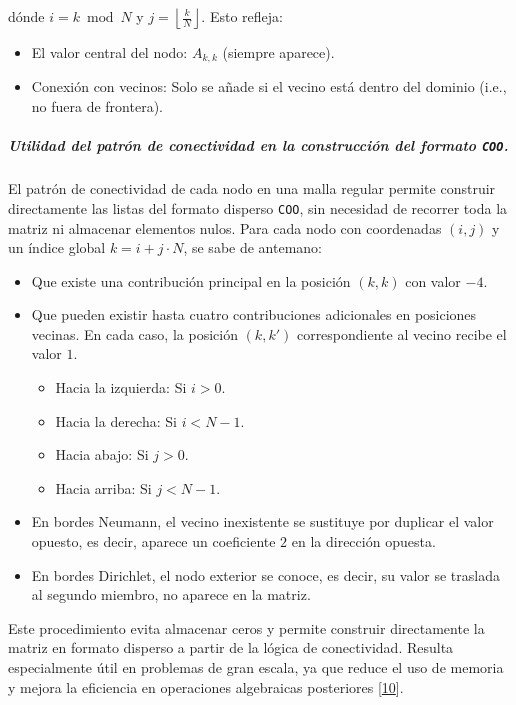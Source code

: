 \documentclass{article}
\begin{document}
\noindent dónde $i = k \bmod N$ y $j = \left\lfloor \frac{k}{N} \right\rfloor$. Esto refleja:
\begin{itemize}
    \item El valor central del nodo: $A_{k,k}$ (siempre aparece).
    \item Conexión con vecinos: Solo se añade si el vecino está dentro del dominio (i.e., no fuera de frontera).
\end{itemize}

\subparagraph{Utilidad del patrón de conectividad en la construcción del formato \texttt{COO}.} El patrón de conectividad de cada nodo en una malla regular permite construir directamente las listas del formato disperso \texttt{COO}, sin necesidad de recorrer toda la matriz ni almacenar elementos nulos. Para cada nodo con coordenadas $(i, j)$ y un índice global $k = i + j \cdot N$, se sabe de antemano:

\begin{itemize}
    \item Que existe una contribución principal en la posición $(k, k)$ con valor $-4$.
    \item Que pueden existir hasta cuatro contribuciones adicionales en posiciones vecinas. En cada caso, la posición $(k, k')$ correspondiente al vecino recibe el valor $1$.
    \begin{itemize}
        \item Hacia la izquierda: Si $i > 0$.
        \item Hacia la derecha: Si $i < N - 1$.
        \item Hacia abajo: Si $j > 0$.
        \item Hacia arriba: Si $j < N - 1$.
    \end{itemize}
    \item En bordes Neumann, el vecino inexistente se sustituye por duplicar el valor opuesto, es decir, aparece un coeficiente $2$ en la dirección opuesta.
    \item En bordes Dirichlet, el nodo exterior se conoce, es decir, su valor se traslada al segundo miembro, no aparece en la matriz.
\end{itemize}
Este procedimiento evita almacenar ceros y permite construir directamente la matriz en formato disperso a partir de la lógica de conectividad. Resulta especialmente útil en problemas de gran escala, ya que reduce el uso de memoria y mejora la eficiencia en operaciones algebraicas posteriores [\href{https://diposit.ub.edu/dspace/bitstream/2445/122103/2/memoria.pdf}{10}].\\
\end{document}
